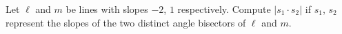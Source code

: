 Let $\ell$ and $m$ be lines with slopes $-2$, $1$ respectively. Compute $|s_1 \cdot s_2|$ if $s_1$, $s_2$ represent the slopes of the two distinct angle bisectors of $\ell$ and $m$.

